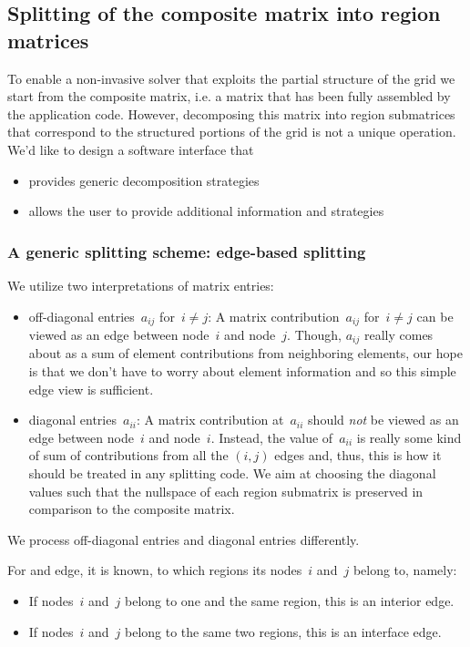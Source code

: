 \documentclass[11pt]{article}
\begin{document}
\subsection{Splitting of the composite matrix into region matrices}

To enable a non-invasive solver that exploits the partial structure of the grid
we start from the composite matrix, i.e. a matrix that has been fully assembled
by the application code. However, decomposing this matrix into region submatrices
that correspond to the structured portions of the grid is not a unique operation.
We'd like to design a software interface that 
\begin{itemize}
\item provides generic decomposition strategies
\item allows the user to provide additional information and strategies
\end{itemize}

\subsubsection{A generic splitting scheme: edge-based splitting}

We utilize two interpretations of matrix entries:
\begin{itemize}
\item off-diagonal entries~$a_{ij}$ for~$i \neq j$: 
A matrix contribution~$a_{ij}$ for~$i \neq j$ can be viewed as an edge between node~$i$ and node~$j$. 
Though, $a_{ij}$ really comes about as a sum of element contributions from neighboring elements, 
our hope is that we don't have to worry about element information and so this simple edge view is sufficient.
\item diagonal entries~$a_{ii}$: 
A matrix contribution at~$a_{ii}$ should \emph{not} be viewed as an edge between node~$i$ and node~$i$. 
Instead, the value of~$a_{ii}$ is really some kind of sum of contributions from all the $(i,j)$ edges 
and, thus, this is how it should be treated in any splitting code. We aim at choosing the diagonal values 
such that the nullspace of each region submatrix is preserved in comparison to the composite matrix.
\end{itemize}
We process off-diagonal entries and diagonal entries differently.

For and edge, it is known, to which regions its nodes~$i$ and~$j$ belong to, namely:
\begin{itemize}
\item If nodes~$i$ and~$j$ belong to one and the same region, this is an interior edge.
\item If nodes~$i$ and~$j$ belong to the same two regions, this is an interface edge.
\end{itemize}
\end{document}
